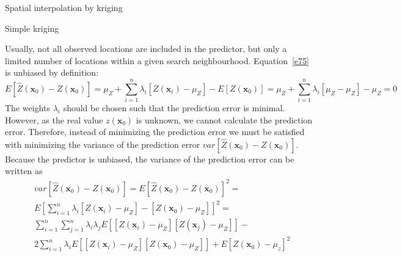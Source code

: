 \documentclass[8pt]{beamer}
\renewcommand{\emph}[1]{\textcolor{myorange}{#1}}
\begin{document}
 \begin{frame}{Spatial interpolation by kriging}
    \begin{block}{Simple kriging}
    \end{block}
    Usually, not all observed locations are included in the predictor, but only a limited number of locations within a given \emph{search neighbourhood}. Equation~\ref{e75} is unbiased by definition:
            \begin{equation}
                E[\hat{Z}(\mathbf{x}_0) -Z(\mathbf{x}_0)]  = \mu_Z + \sum_{i=1}^n \lambda_i [Z(\mathbf{x}_i)-\mu_Z] -E[Z(\mathbf{x}_0)] = \mu_Z + \sum_{i=1}^n \lambda_i [\mu_Z -\mu_Z] -\mu_Z = 0
                \label{e76}
            \end{equation}
            The \emph{weights} $\lambda_i$  should be chosen such that the \emph{prediction error} is minimal. However, as the real value $z(\mathbf{x}_0)$ is unknown, we cannot calculate the \emph{prediction error}. Therefore, instead of minimizing the prediction error we must be satisfied with minimizing the \emph{variance} of the prediction error $var[\hat{Z}(\mathbf{x}_0)-Z(\mathbf{x}_0)]$. Because the predictor is unbiased, the \emph{variance} of the \emph{prediction error} can be written as
            \begin{equation}
                \begin{aligned}
                &var[\hat{Z}(\mathbf{x}_0) -Z(\mathbf{x}_0)]  = E[\hat{Z}(\mathbf{x}_0) -Z(\mathbf{x}_0)]^2 = \\
                &E\left[  \sum_{i=1}^n \lambda_i [Z(\mathbf{x}_i)-\mu_Z] -[Z(\mathbf{x}_0) -\mu_Z]\right]^2 = \\
                &\sum_{i=1}^n \sum_{j=1}^n  \lambda_i \lambda_j E\left[[Z(\mathbf{x}_i)-\mu_Z]  [Z(\mathbf{x}_j)-\mu_Z] \right] - \\
                &2\sum_{i=1}^n \lambda_i E\left[[Z(\mathbf{x}_i)-\mu_Z] [Z(\mathbf{x}_0)-\mu_Z] \right] + E[Z(\mathbf{x}_0)-\mu_z]^2
                \end{aligned}
                \label{e77}
            \end{equation}
\end{frame}
 
\end{document}
